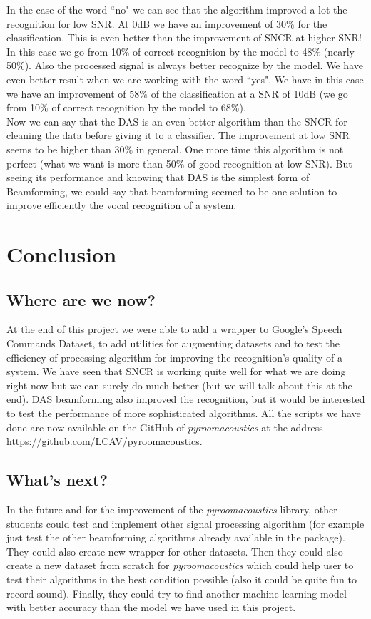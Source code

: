 \documentclass[11pt,a4paper,titlepage]{report}
\begin{document}
In the case of the word ``no" we can see that the algorithm improved a lot the recognition for low SNR. At 0dB we have an improvement of 30$\%$ for the classification. This is even better than the improvement of SNCR at higher SNR! In this case we go from 10$\%$ of correct recognition by the model to 48$\%$ (nearly 50$\%$). Also the processed signal is always better recognize by the model. We have even better result when we are working with the word ``yes". We have in this case we have an improvement of 58$\%$ of the classification at a SNR of 10dB (we go from 10$\%$ of correct recognition by the model to 68$\%$).\\
Now we can say that the DAS is an even better algorithm than the SNCR for cleaning the data before giving it to a classifier. The improvement at low SNR seems to be higher than 30$\%$ in general. One more time this algorithm is not perfect (what we want is more than 50$\%$ of good recognition at low SNR). But seeing its performance and knowing that DAS is the simplest form of Beamforming, we could say that beamforming seemed to be one solution to improve efficiently the vocal recognition of a system.
\chapter{Conclusion}
\section{Where are we now?}
\hspace*{0.6cm}
At the end of this project we were able to add a wrapper to Google's Speech Commands Dataset, to add utilities for augmenting  datasets and to test the efficiency of processing algorithm for improving the recognition's quality of a system. We have seen that SNCR is working quite well for what we are doing right now but we can surely do much better (but we will talk about this at the end). DAS beamforming also improved the recognition, but it would be interested to test the performance of more sophisticated algorithms.
All the scripts we have done are now available on the GitHub of \textit{pyroomacoustics} at the address \url{https://github.com/LCAV/pyroomacoustics}. 

\section{What's next?}
In the future and for the improvement of the \textit{pyroomacoustics} library, other students could test and implement other signal processing algorithm (for example just test the other beamforming algorithms already available in the package). They could also create new wrapper for other datasets. Then they could also create a new dataset from scratch for \textit{pyroomacoustics} which could help user to test their algorithms in the best condition possible (also it could be quite fun to record sound). Finally, they could try to find another machine learning model with better accuracy than the model we have used in this project.
\end{document}
